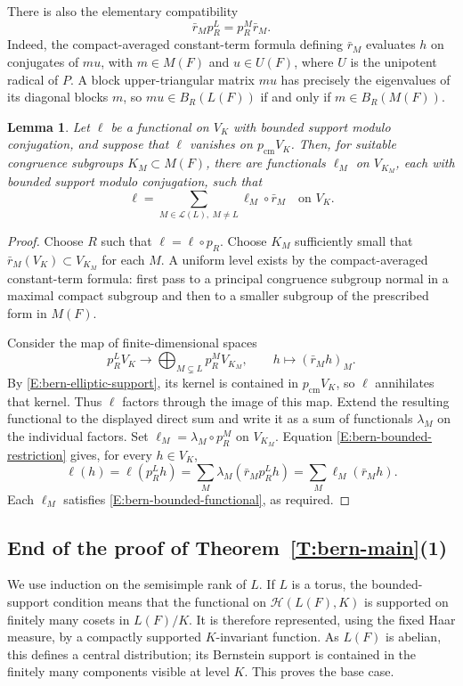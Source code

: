 \documentclass[11pt,a4paper]{amsart}
\newcommand{\mcH}{\mathcal H}
\newtheorem{lemma}[theorem]{Lemma}
\theoremstyle{definition}
\theoremstyle{remark}
\begin{document}
There is also the elementary compatibility
\begin{equation}\label{E:bern-bounded-restriction}
 \bar r_Mp_R^L=p_R^M\bar r_M.
\end{equation}
Indeed, the compact-averaged constant-term formula defining
$\bar r_M$ evaluates $h$ on conjugates of $mu$, with $m\in M(F)$ and
$u\in U(F)$, where $U$ is the unipotent radical of $P$. A block upper-triangular matrix $mu$
has precisely the eigenvalues of its diagonal blocks $m$, so
$mu\in B_R(L(F))$ if and only if $m\in B_R(M(F))$.

\begin{lemma}\label{L:bern-descent}
Let $\ell$ be a functional on $V_K$ with bounded support modulo
conjugation, and suppose that $\ell$ vanishes on $p_{\mathrm{cm}}V_K$.
Then, for suitable congruence subgroups $K_M\subset M(F)$, there are
functionals $\ell_M$ on $V_{K_M}$, each with bounded support modulo
conjugation, such that
\begin{equation}\label{E:bern-descent}
 \ell=\sum_{M\in\mathcal L(L),\ M\ne L}\ell_M\circ\bar r_M
 \quad\text{on }V_K.
\end{equation}
\end{lemma}

\begin{proof}
Choose $R$ such that $\ell=\ell\circ p_R$. Choose $K_M$ sufficiently
small that $\bar r_M(V_K)\subset V_{K_M}$ for each $M$. A uniform
level exists by the compact-averaged constant-term formula: first
pass to a principal congruence subgroup normal in a maximal compact
subgroup and then to a smaller subgroup of the prescribed form in $M(F)$.

Consider the map of finite-dimensional spaces
$$
 p_R^LV_K\longrightarrow
       \bigoplus_{M\subsetneq L}p_R^MV_{K_M},
 \qquad h\longmapsto(\bar r_Mh)_M.
$$
By \eqref{E:bern-elliptic-support}, its kernel is contained in
$p_{\mathrm{cm}}V_K$, so $\ell$ annihilates that kernel. Thus $\ell$
factors through the image of this map. Extend the resulting functional
to the displayed direct sum and write it as a sum of functionals
$\lambda_M$ on the individual factors. Set
$\ell_M=\lambda_M\circ p_R^M$ on $V_{K_M}$.
Equation \eqref{E:bern-bounded-restriction} gives, for every $h\in V_K$,
$$
 \ell(h)=\ell(p_R^Lh)
 =\sum_M\lambda_M(\bar r_Mp_R^Lh)
 =\sum_M\ell_M(\bar r_Mh).
$$
Each $\ell_M$ satisfies \eqref{E:bern-bounded-functional}, as required.
\end{proof}

\subsection{End of the proof of Theorem~\ref{T:bern-main}(1)}
We use induction on the semisimple rank of $L$.
If $L$ is a torus, the bounded-support condition means that the
functional on $\mcH(L(F),K)$ is supported on finitely many cosets
in $L(F)/K$. It is therefore represented, using the fixed Haar
measure, by a compactly supported $K$-invariant function.
As $L(F)$ is abelian, this defines a central distribution; its
Bernstein support is contained in the finitely many components
visible at level $K$. This proves the base case.
\end{document}
